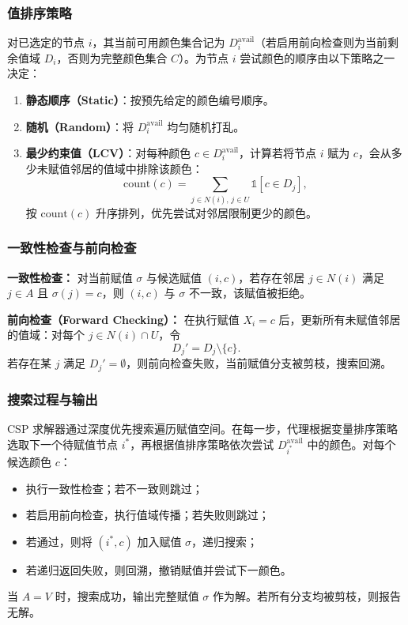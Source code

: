 \subsubsection{值排序策略}
对已选定的节点 $i$，其当前可用颜色集合记为 $D_i^{\mathrm{avail}}$（若启用前向检查则为当前剩余值域 $D_i$，否则为完整颜色集合 $C$）。为节点 $i$ 尝试颜色的顺序由以下策略之一决定：
\begin{enumerate}
  \item \textbf{静态顺序（Static）}：按预先给定的颜色编号顺序。
  \item \textbf{随机（Random）}：将 $D_i^{\mathrm{avail}}$ 均匀随机打乱。
  \item \textbf{最少约束值（LCV）}：对每种颜色 $c\in D_i^{\mathrm{avail}}$，计算若将节点 $i$ 赋为 $c$，会从多少未赋值邻居的值域中排除该颜色：
  \begin{equation}
    \mathrm{count}(c)=\sum_{j\in N(i),\, j\in U}\mathbb{1}[c\in D_j],
  \end{equation}
  按 $\mathrm{count}(c)$ 升序排列，优先尝试对邻居限制更少的颜色。
\end{enumerate}

\subsubsection{一致性检查与前向检查}
\textbf{一致性检查：}
对当前赋值 $\sigma$ 与候选赋值 $(i,c)$，若存在邻居 $j\in N(i)$ 满足 $j\in A$ 且 $\sigma(j)=c$，则 $(i,c)$ 与 $\sigma$ 不一致，该赋值被拒绝。

\textbf{前向检查（Forward Checking）：}
在执行赋值 $X_i=c$ 后，更新所有未赋值邻居的值域：对每个 $j\in N(i)\cap U$，令
\begin{equation}
  D_j' = D_j\setminus\{c\}.
\end{equation}
若存在某 $j$ 满足 $D_j'=\emptyset$，则前向检查失败，当前赋值分支被剪枝，搜索回溯。

\subsubsection{搜索过程与输出}
CSP 求解器通过深度优先搜索遍历赋值空间。在每一步，代理根据变量排序策略选取下一个待赋值节点 $i^{*}$，再根据值排序策略依次尝试 $D_{i^{*}}^{\mathrm{avail}}$ 中的颜色。对每个候选颜色 $c$：
\begin{itemize}
  \item 执行一致性检查；若不一致则跳过；
  \item 若启用前向检查，执行值域传播；若失败则跳过；
  \item 若通过，则将 $(i^{*},c)$ 加入赋值 $\sigma$，递归搜索；
  \item 若递归返回失败，则回溯，撤销赋值并尝试下一颜色。
\end{itemize}
当 $A=V$ 时，搜索成功，输出完整赋值 $\sigma$ 作为解。若所有分支均被剪枝，则报告无解。

